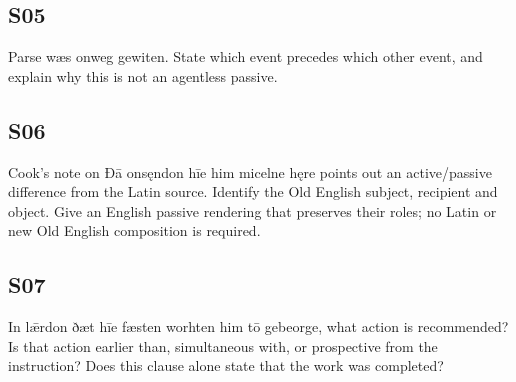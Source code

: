 \subsection*{S05}

\par\begin{minipage}{\linewidth}\raggedright
Parse wæs onweg gewiten. State which event precedes which other event, and explain why this is not an agentless passive.

\end{minipage}\par\addvspace{4pt}

\subsection*{S06}

\par\begin{minipage}{\linewidth}\raggedright
Cook’s note on Ðā onsęndon hīe him micelne hęre points out an active/\allowbreak{}passive difference from the Latin source. Identify the Old English subject, recipient and object. Give an English passive rendering that preserves their roles; no Latin or new Old English composition is required.

\end{minipage}\par\addvspace{4pt}

\subsection*{S07}

\par\begin{minipage}{\linewidth}\raggedright
In lǣrdon ðæt hīe fæsten worhten him tō gebeorge, what action is recommended? Is that action earlier than, simultaneous with, or prospective from the instruction? Does this clause alone state that the work was completed?

\end{minipage}\par\addvspace{4pt}

